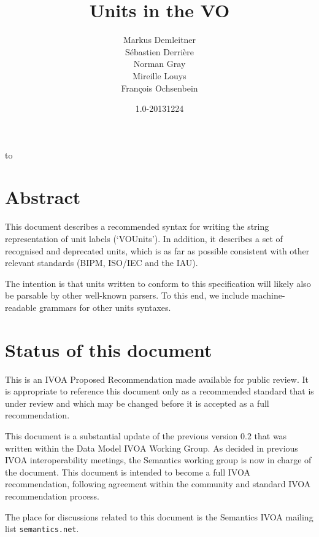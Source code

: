 \documentclass[11pt,notitlepage,onecolumn]{ivoa}
\title{Units in the VO}
\date{1.0-20131224}
\author{Markus Demleitner\\
S\'{e}bastien Derri\`ere\\
Norman Gray\\
Mireille Louys\\
Fran\c{c}ois Ochsenbein}
\begin{document}
\maketitle %
\thispagestyle{empty}
\begingroup
\vfill
\hbox to \textwidth{\hfil\tiny code.google.com/p/volute, rev\SVNRevision, \SVNDate}
\endgroup
\newpage
\tableofcontents 
\newpage
\listoftables
\newpage
\section*{Abstract}
This document describes a recommended syntax for writing the string
representation of unit labels (`VOUnits').  In addition, it describes
a set of recognised and deprecated units, which is as far as possible
consistent with other relevant standards (BIPM, ISO/IEC and the IAU).

The intention is that units written to conform to this specification
will likely also be parsable by other well-known parsers.  To this
end, we include machine-readable grammars for other units syntaxes.

\section*{Status of this document}

This is an IVOA Proposed Recommendation made available for public review.
It is appropriate to reference this document only as a recommended standard 
that is under review and which may be changed before it is accepted as a full recommendation.


This document is a substantial update of the previous version 0.2 that
was written within the Data Model IVOA Working Group. As decided in previous
IVOA interoperability meetings, the Semantics working group is now in charge 
of the document. This document is intended to become a full IVOA recommendation,
following agreement within the community and standard IVOA recommendation process.

The place for discussions related to this document is the
Semantics IVOA mailing list {\tt semantics\@@ivoa.net}.
\end{document}

